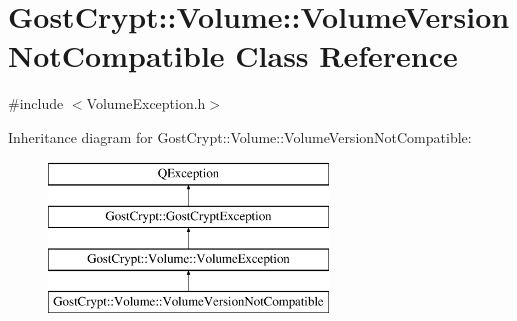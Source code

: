 \hypertarget{class_gost_crypt_1_1_volume_1_1_volume_version_not_compatible}{}\section{Gost\+Crypt\+:\+:Volume\+:\+:Volume\+Version\+Not\+Compatible Class Reference}
\label{class_gost_crypt_1_1_volume_1_1_volume_version_not_compatible}


{\ttfamily \#include $<$Volume\+Exception.\+h$>$}

Inheritance diagram for Gost\+Crypt\+:\+:Volume\+:\+:Volume\+Version\+Not\+Compatible\+:\begin{figure}[H]
\begin{center}
\leavevmode
\includegraphics[height=4.000000cm]{class_gost_crypt_1_1_volume_1_1_volume_version_not_compatible}
\end{center}
\end{figure}
